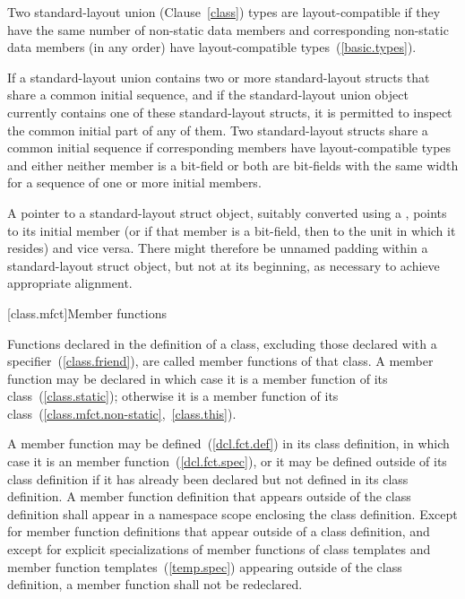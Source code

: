 \pnum
Two standard-layout union (Clause~\ref{class}) types are layout-compatible if they
have the same number of non-static data members and corresponding
non-static data members (in any order) have layout-compatible
types~(\ref{basic.types}).

\pnum
If a standard-layout union contains two or more
standard-layout structs that share a common
initial sequence, and if the standard-layout union object currently contains one of
these standard-layout structs, it is permitted to inspect the common initial part of
any of them. Two standard-layout structs share a common initial sequence if
corresponding members have layout-compatible types and either neither member is a bit-field or both are bit-fields with the same width for a sequence of one or more initial members.

\pnum
A pointer to a standard-layout struct object, suitably converted using a
, points to its initial member (or if that
member is a bit-field, then to the unit in which it resides) and vice
versa.
\enternote
There might therefore be unnamed padding within a standard-layout struct object, but
not at its beginning, as necessary to achieve appropriate alignment.
\exitnote

[class.mfct]{Member functions}%

\pnum
Functions declared in the definition of a class, excluding those
declared with a  specifier~(\ref{class.friend}), are
called member functions of that class. A member function may be declared
 in which case it is a  member function
of its class~(\ref{class.static}); otherwise it is a
 member function of its
class~(\ref{class.mfct.non-static},~\ref{class.this}).

\pnum
{}%
%
A member function may be defined~(\ref{dcl.fct.def}) in its class
definition, in which case it is an  member
function~(\ref{dcl.fct.spec}), or it may be defined outside of its class
definition if it has already been declared but not defined in its class
definition. A member function definition that appears outside of the
class definition shall appear in a namespace scope enclosing the class
definition. Except for member function definitions that appear outside
of a class definition, and except for explicit specializations of member
functions of class templates and member function
templates~(\ref{temp.spec}) appearing outside of the class definition, a
member function shall not be redeclared.

